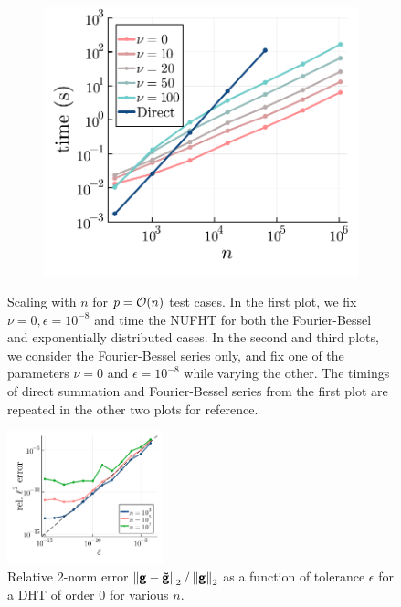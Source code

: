 \begin{figure}
\begin{subfigure}[b]{0.32\textwidth}
  \end{subfigure} 
  \begin{subfigure}[b]{0.32\textwidth}
    \includegraphics[height=0.92\textwidth, trim={1.3cm 0 0.4cm 0}, clip]{./figures/nu_scaling.pdf}
  \end{subfigure}
  \caption{Scaling with $n$ for $p = \bO(n)$ test cases. In the first plot, we
  fix $\nu = 0, \epsilon = 10^{-8}$ and time the NUFHT for both the
  Fourier-Bessel and exponentially distributed cases. In the second and third
  plots, we consider the Fourier-Bessel series only, and fix one of the
  parameters $\nu = 0$ and $\epsilon = 10^{-8}$ while varying the other. The
  timings of direct summation and Fourier-Bessel series from the first plot are
  repeated in the other two plots for reference.}
  \label{fig:both-scaling}
\end{figure}

\begin{figure}[t]
  \centering
  \includegraphics[width=0.4\textwidth]{./figures/accuracy.pdf}
  \caption{Relative 2-norm error $\norm[2]{\vct{g} - \vct{\tilde{g}}} /
  \norm[2]{\vct{g}}$ as a function of tolerance $\epsilon$ for a DHT of order
  $0$ for various $n$.}
  \label{fig:accuracy}
\end{figure}

